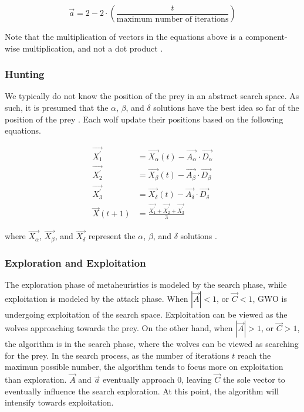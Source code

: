 $$
\vec{a} = 2 - 2 \cdot \left( \frac{t}{\text{maximum number of iterations}} \right)
$$

Note that the multiplication of vectors in the equations above is a component-wise multiplication, and not a dot product \cite{Mirjalili2020-MathModel}.

\subsubsection{Hunting}
We typically do not know the position of the prey in an abstract search space. As such, it is presumed that the $\alpha$, $\beta$, and $\delta$ solutions have the best idea so far of the position of the prey \cite{Mirjalili20}. Each wolf update their positions based on the following equations.

\begin{align}
	\vec{X_{1}^{'}} &= \vec{X_{\alpha}}(t) - \vec{A_{\alpha}} \cdot \vec{D_{\alpha}} \\
	\vec{X_{2}^{'}} &= \vec{X_{\beta}}(t) - \vec{A_{\beta}} \cdot \vec{D_{\beta}} \\
	\vec{X_{3}^{'}} &= \vec{X_{\delta}}(t) - \vec{A_{\delta}} \cdot \vec{D_{\delta}} \\
	\vec{X}(t + 1)  &= \frac{\vec{X_{1}^{'}} + \vec{X_{2}^{'}} + \vec{X_{3}^{'}}}{3}
\end{align}

where $\vec{X_{\alpha}}$, $\vec{X_{\beta}}$, and $\vec{X_{\delta}}$ represent the $\alpha$, $\beta$, and $\delta$ solutions \cite{Gupta2018}.

\subsubsection{Exploration and Exploitation}
The exploration phase of metaheuristics is modeled by the search phase, while exploitation is modeled by the attack phase. When $\left| \vec{A} \right| < 1$, or $\vec{C} < 1$, GWO is undergoing exploitation of the search space. Exploitation can be viewed as the wolves approaching towards the prey. On the other hand, when $\left| \vec{A} \right| > 1$, or $\vec{C} > 1$, the algorithm is in the search phase, where the wolves can be viewed as searching for the prey. In the search process, as the number of iterations $t$ reach the maximun possible number, the algorithm tends to focus more on exploitation than exploration. $\vec{A}$ and $\vec{a}$ eventually approach $0$, leaving $\vec{C}$ the sole vector to eventually influence the search exploration. At this point, the algorithm will intensify towards exploitation. 